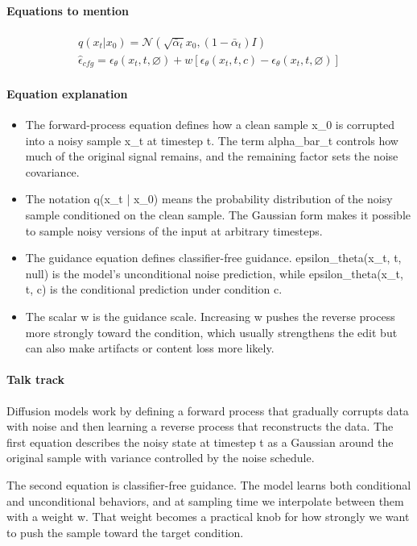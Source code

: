 \documentclass[11pt]{article}
\begin{document}
\paragraph{Equations to mention}
\begin{align*}
q(x_t|x_0)=\mathcal{N}(\sqrt{\bar{\alpha}_t}x_0, (1-\bar{\alpha}_t)I)\\
\hat{\epsilon}_{cfg}=\epsilon_\theta(x_t,t,\varnothing)+w[\epsilon_\theta(x_t,t,c)-\epsilon_\theta(x_t,t,\varnothing)]
\end{align*}
\paragraph{Equation explanation}
\begin{itemize}
\item The forward-process equation defines how a clean sample x\_0 is corrupted into a noisy sample x\_t at timestep t. The term alpha\_bar\_t controls how much of the original signal remains, and the remaining factor sets the noise covariance.
\item The notation q(x\_t | x\_0) means the probability distribution of the noisy sample conditioned on the clean sample. The Gaussian form makes it possible to sample noisy versions of the input at arbitrary timesteps.
\item The guidance equation defines classifier-free guidance. epsilon\_theta(x\_t, t, null) is the model's unconditional noise prediction, while epsilon\_theta(x\_t, t, c) is the conditional prediction under condition c.
\item The scalar w is the guidance scale. Increasing w pushes the reverse process more strongly toward the condition, which usually strengthens the edit but can also make artifacts or content loss more likely.
\end{itemize}
\paragraph{Talk track}
Diffusion models work by defining a forward process that gradually corrupts data with noise and then learning a reverse process that reconstructs the data. The first equation describes the noisy state at timestep t as a Gaussian around the original sample with variance controlled by the noise schedule.

The second equation is classifier-free guidance. The model learns both conditional and unconditional behaviors, and at sampling time we interpolate between them with a weight w. That weight becomes a practical knob for how strongly we want to push the sample toward the target condition.
\end{document}
